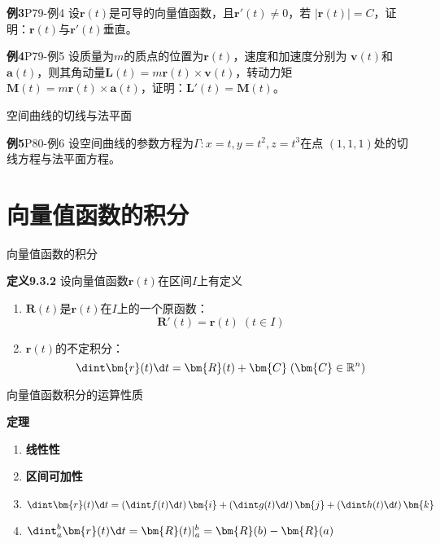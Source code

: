 \begin{frame}
	\linespread{1.2}
	\begin{exampleblock}{{\bf 例3}\hfill P79-例4}
		设$\bm{r}(t)$是可导的向量值函数，且$\bm{r}'(t)\ne 0$，若
		$|\bm{r}(t)|=C$，证明：$\bm{r}(t)$与$\bm{r}'(t)$垂直。
	\end{exampleblock}
	\pause\bigskip
	\begin{exampleblock}{{\bf 例4}\hfill P79-例5}
		设质量为$m$的质点的位置为$\bm{r}(t)$，速度和加速度分别为
		$\bm{v}(t)$和$\bm{a}(t)$，则其角动量$\bm{L}(t)
		=m\bm{r}(t)\times\bm{v}(t)$，转动力矩$\bm{M}(t)=m\bm{r}(t)
		\times\bm{a}(t)$，证明：$\bm{L}'(t)=\bm{M}(t)$。
	\end{exampleblock}
\end{frame}

\begin{frame}{空间曲线的切线与法平面}
	\linespread{1.2}
	\begin{exampleblock}{{\bf 例5}\hfill P80-例6}
		设空间曲线的参数方程为$\Gamma:x=t,y=t^2,z=t^3$在点
		$(1,1,1)$处的切线方程与法平面方程。
	\end{exampleblock}
\end{frame}

\section{向量值函数的积分}

\begin{frame}{向量值函数的积分}
	\linespread{1.2}\pause 
	\begin{block}{{\bf 定义9.3.2}\hfill}
		设向量值函数$\bm{r}(t)$在区间$I$上有定义\pause 
		\begin{enumerate}
		  \item {\bb $\bm{R}(t)$是$\bm{r}(t)$在$I$上的一个原函数：}\pause 
		  $$\bm{R}'(t)=\bm{r}(t)\;(t\in I)$$\pause 
		  \vspace{-1em}
		  \item {\bb $\bm{r}(t)$的不定积分：}
		  $$\dint \bm{r}(t)\d t=\bm{R}(t)+\bm{C}\;(\bm{C}\in\mathbb{R}^n)$$
		\end{enumerate}
	\end{block}
\end{frame}

\begin{frame}{向量值函数积分的运算性质}
	\linespread{1.2}\pause 
	\begin{block}{{\bf 定理}\hfill}
		\begin{enumerate}
		  \item {\bf 线性性}\pause 
		  \item {\bf 区间可加性}\pause 
		  \item $\dint\bm{r}(t)\d t=\left(\dint f(t)\d t\right)\bm{i}
		  +\left(\dint g(t)\d t\right)\bm{j}+\left(\dint h(t)\d t\right)\bm{k}$\pause 
		  \item $\dint_a^b\bm{r}(t)\d t=\bm{R}(t)|_a^b=\bm{R}(b)-\bm{R}(a)$
		\end{enumerate}
	\end{block}
\end{frame}

